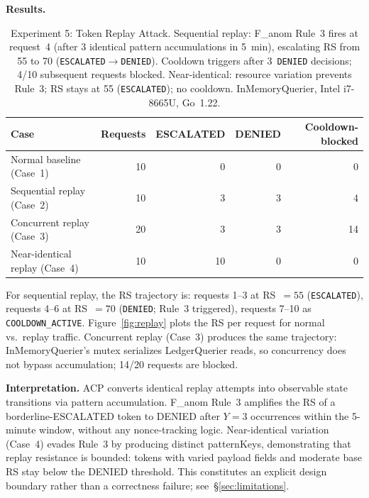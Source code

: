 \documentclass[11pt]{article}
\theoremstyle{definition}
\begin{document}
\textbf{Results.}
\begin{table}[h!]
\centering\small
\begin{tabular}{lrrrr}
\toprule
Case & Requests & ESCALATED & DENIED & Cooldown-blocked \\
\midrule
Normal baseline (Case~1)      & 10 &  0 & 0 &  0 \\
Sequential replay (Case~2)    & 10 &  3 & 3 &  4 \\
Concurrent replay (Case~3)    & 20 &  3 & 3 & 14 \\
Near-identical replay (Case~4) & 10 & 10 & 0 &  0 \\
\bottomrule
\end{tabular}
\caption{Experiment 5: Token Replay Attack.
Sequential replay: F\_anom Rule~3 fires at request~4 (after 3 identical
pattern accumulations in 5~min), escalating RS from 55 to 70 (\texttt{ESCALATED}$\to$\texttt{DENIED}).
Cooldown triggers after 3~\texttt{DENIED} decisions; 4/10 subsequent requests blocked.
Near-identical: resource variation prevents Rule~3; RS stays at 55 (\texttt{ESCALATED}); no cooldown.
InMemoryQuerier, Intel i7-8665U, Go~1.22.}
\label{tab:adv-exp5}
\end{table}

For sequential replay, the RS trajectory is:
requests 1--3 at RS~$=55$ (\texttt{ESCALATED}),
requests 4--6 at RS~$=70$ (\texttt{DENIED}; Rule~3 triggered),
requests 7--10 as \texttt{COOLDOWN\_ACTIVE}.
Figure~\ref{fig:replay} plots the RS per request for normal vs.\ replay traffic.
Concurrent replay (Case~3) produces the same trajectory: InMemoryQuerier's
mutex serializes LedgerQuerier reads, so concurrency does not bypass accumulation;
14/20 requests are blocked.

\textbf{Interpretation.}
ACP converts identical replay attempts into observable state transitions via
pattern accumulation.
F\_anom Rule~3 amplifies the RS of a borderline-ESCALATED token to DENIED
after $Y=3$ occurrences within the 5-minute window, without any nonce-tracking logic.
Near-identical variation (Case~4) evades Rule~3 by producing distinct patternKeys,
demonstrating that replay resistance is bounded: tokens with varied payload fields
and moderate base RS stay below the DENIED threshold.
This constitutes an explicit design boundary rather than a correctness failure;
see~§\ref{sec:limitations}.
\end{document}
